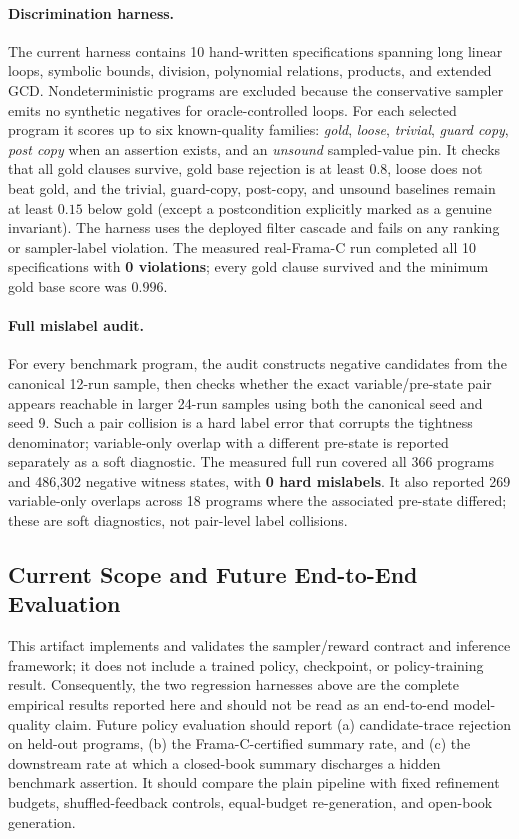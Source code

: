 \paragraph{Discrimination harness.}
The current harness contains 10 hand-written specifications spanning long linear loops, symbolic bounds, division, polynomial relations, products, and extended GCD.  Nondeterministic programs are excluded because the conservative sampler emits no synthetic negatives for oracle-controlled loops.  For each selected program it scores up to six known-quality families: \emph{gold}, \emph{loose}, \emph{trivial}, \emph{guard copy}, \emph{post copy} when an assertion exists, and an \emph{unsound} sampled-value pin.
It checks that all gold clauses survive, gold base rejection is at least $0.8$, loose does not beat gold, and the trivial, guard-copy, post-copy, and unsound baselines remain at least $0.15$ below gold (except a postcondition explicitly marked as a genuine invariant).  The harness uses the deployed filter cascade and fails on any ranking or sampler-label violation.
The measured real-Frama-C run completed all 10 specifications with \textbf{0 violations}; every gold clause survived and the minimum gold base score was $0.996$.

\paragraph{Full mislabel audit.}
For every benchmark program, the audit constructs negative candidates from the canonical 12-run sample, then checks whether the exact variable/pre-state pair appears reachable in larger 24-run samples using both the canonical seed and seed 9.  Such a pair collision is a hard label error that corrupts the tightness denominator; variable-only overlap with a different pre-state is reported separately as a soft diagnostic.
The measured full run covered all 366 programs and 486,302 negative witness states, with \textbf{0 hard mislabels}.  It also reported 269 variable-only overlaps across 18 programs where the associated pre-state differed; these are soft diagnostics, not pair-level label collisions.

\subsection{Current Scope and Future End-to-End Evaluation}
\label{sec:exp:rl}

This artifact implements and validates the sampler/reward contract and inference framework; it does not include a trained policy, checkpoint, or policy-training result.  Consequently, the two regression harnesses above are the complete empirical results reported here and should not be read as an end-to-end model-quality claim.
Future policy evaluation should report (a) candidate-trace rejection on held-out programs, (b) the Frama-C-certified summary rate, and (c) the downstream rate at which a closed-book summary discharges a hidden benchmark assertion.  It should compare the plain pipeline with fixed refinement budgets, shuffled-feedback controls, equal-budget re-generation, and open-book generation.
